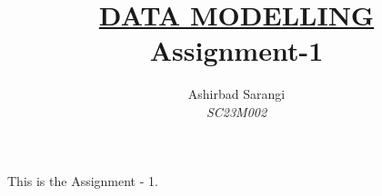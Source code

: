 \documentclass[a4paper, 12pt]{article}
\title{\underline{DATA MODELLING} \\Assignment-1}
\author{Ashirbad Sarangi \\\textit{SC23M002}}
\begin{document}
\maketitle

This is the Assignment - 1.
\end{document}
